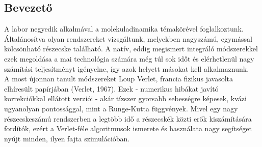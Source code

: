 \begin{multicols}{2}

\section{Bevezető} \label{sec:1}
A labor negyedik alkalmával a molekuladinamika témakörével foglalkoztunk. Általánosítva olyan rendszereket vizsgáltunk, melyekben nagyszámú, egymással kölcsönható részecske található. A natív, eddig megismert integráló módszerekkel ezek megoldása a mai technológia számára még túl sok időt és elérhetlenül nagy számítási teljesítményt igényelne, így azok helyett másokat kell alkalmaznunk. \\
A most újonnan tanult módszereket Loup Verlet, francia fizikus javasolta elhíresült papírjában (Verlet, 1967\cite{verlet1967computer}). Ezek - numerikus hibákat javító korrekciókkal ellátott verziói - akár tízszer gyorsabb sebességre képesek, kvázi ugyanolyan pontossággal, mint a Runge-Kutta függvények. Mivel egy nagy részecskeszámú rendszerben a legtöbb idő a részecskék közti erők kiszámítására fordítók, ezért a Verlet-féle algoritmusok ismerete és használata nagy segítséget nyújt minden, ilyen fajta szimulációban.


\end{multicols}
